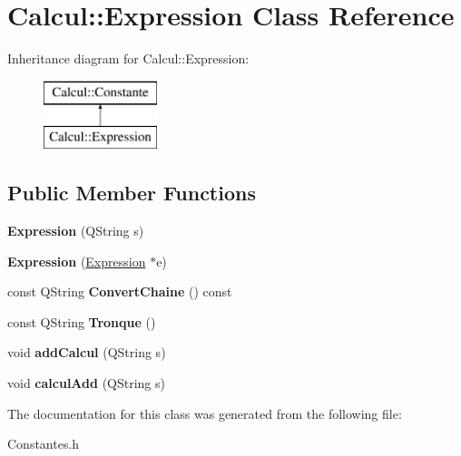 \hypertarget{class_calcul_1_1_expression}{\section{Calcul\-:\-:Expression Class Reference}
\label{class_calcul_1_1_expression}
}
Inheritance diagram for Calcul\-:\-:Expression\-:\begin{figure}[H]
\begin{center}
\leavevmode
\includegraphics[height=2.000000cm]{class_calcul_1_1_expression}
\end{center}
\end{figure}
\subsection*{Public Member Functions}
\begin{DoxyCompactItemize}
\item 
\hypertarget{class_calcul_1_1_expression_a756dc07653593481c4643d6a179d239b}{{\bfseries Expression} (Q\-String s)}\label{class_calcul_1_1_expression_a756dc07653593481c4643d6a179d239b}

\item 
\hypertarget{class_calcul_1_1_expression_a28a8ce64db734d8716f120b284a7e6df}{{\bfseries Expression} (\hyperlink{class_calcul_1_1_expression}{Expression} $\ast$e)}\label{class_calcul_1_1_expression_a28a8ce64db734d8716f120b284a7e6df}

\item 
\hypertarget{class_calcul_1_1_expression_a8bffbb504f9348cd69790c0fe23bf67d}{const Q\-String {\bfseries Convert\-Chaine} () const }\label{class_calcul_1_1_expression_a8bffbb504f9348cd69790c0fe23bf67d}

\item 
\hypertarget{class_calcul_1_1_expression_af70b11f7b8fb7fc792df5628b932a117}{const Q\-String {\bfseries Tronque} ()}\label{class_calcul_1_1_expression_af70b11f7b8fb7fc792df5628b932a117}

\item 
\hypertarget{class_calcul_1_1_expression_ac093ea5837a113f64be91e66b055b18b}{void {\bfseries add\-Calcul} (Q\-String s)}\label{class_calcul_1_1_expression_ac093ea5837a113f64be91e66b055b18b}

\item 
\hypertarget{class_calcul_1_1_expression_a0e762d07570ac388d0919a4c2053eecd}{void {\bfseries calcul\-Add} (Q\-String s)}\label{class_calcul_1_1_expression_a0e762d07570ac388d0919a4c2053eecd}

\end{DoxyCompactItemize}


The documentation for this class was generated from the following file\-:\begin{DoxyCompactItemize}
\item 
Constantes.\-h\end{DoxyCompactItemize}
